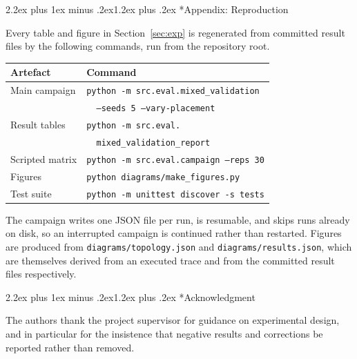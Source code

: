 \documentclass[10pt,twocolumn,a4paper]{article}
\makeatletter
\renewcommand{\section}{\@startsection{section}{1}{\z@}%
  {2.2ex plus 1ex minus .2ex}{1.2ex plus .2ex}%
  {\centering\normalfont\normalsize\scshape}}
\makeatother
\begin{document}
\appendix
\section*{Appendix: Reproduction}

Every table and figure in Section~\ref{sec:exp} is regenerated from committed
result files by the following commands, run from the repository root.

\begin{table}[!htbp]
\centering
\footnotesize
\begin{tabular}{ll}
\toprule
\textbf{Artefact} & \textbf{Command}\\
\midrule
Main campaign & \texttt{python -m src.eval.mixed\_validation}\\
              & \texttt{\ \ --seeds 5 --vary-placement}\\
Result tables & \texttt{python -m src.eval.}\\
              & \texttt{\ \ mixed\_validation\_report}\\
Scripted matrix & \texttt{python -m src.eval.campaign --reps 30}\\
Figures & \texttt{python diagrams/make\_figures.py}\\
Test suite & \texttt{python -m unittest discover -s tests}\\
\bottomrule
\end{tabular}
\end{table}

The campaign writes one JSON file per run, is resumable, and skips runs already
on disk, so an interrupted campaign is continued rather than restarted. Figures
are produced from \texttt{diagrams/topology.json} and
\texttt{diagrams/results.json}, which are themselves derived from an executed
trace and from the committed result files respectively.

\begingroup\samepage
\section*{Acknowledgment}

The authors thank the project supervisor for guidance on experimental design,
and in particular for the insistence that negative results and corrections be
reported rather than removed.\par\endgroup
\end{document}
